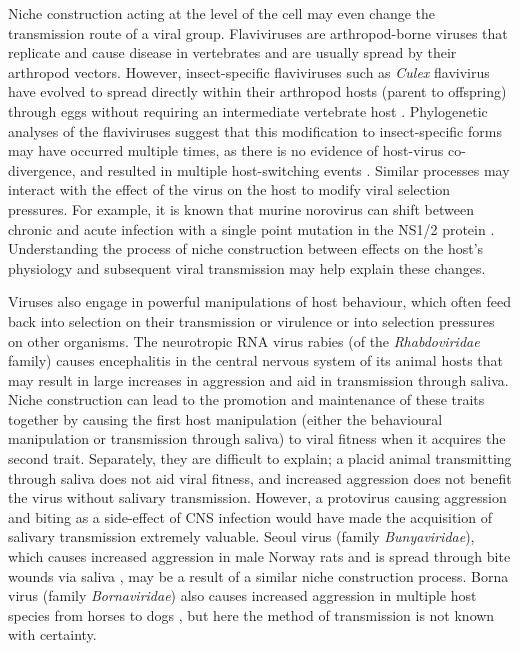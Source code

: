 \documentclass[review,draft,12pt]{elsarticle}
\begin{document}
Niche construction acting at the level of the cell may even change the
transmission route of a viral group. Flaviviruses are arthropod-borne
viruses that replicate and cause disease in vertebrates and are usually
spread by their arthropod vectors. However, insect-specific flaviviruses
such as \emph{Culex} flavivirus have evolved to spread directly within
their arthropod hosts (parent to offspring) through eggs without
requiring an intermediate vertebrate host \citep{Bolling:2012fp}.
Phylogenetic analyses of the flaviviruses suggest that this modification
to insect-specific forms may have occurred multiple times, as there is
no evidence of host-virus co-divergence, and resulted in multiple
host-switching events \citep{Cook:2012gt}. Similar processes may
interact with the effect of the virus on the host to modify viral
selection pressures. For example, it is known that murine norovirus can
shift between chronic and acute infection with a single point mutation
in the NS1/2 protein \citep{Borin2013}. Understanding the process of
niche construction between effects on the host's physiology and
subsequent viral transmission may help explain these changes.

Viruses also engage in powerful manipulations of host behaviour, which
often feed back into selection on their transmission or virulence or
into selection pressures on other organisms. The neurotropic RNA virus
rabies (of the \emph{Rhabdoviridae} family) causes encephalitis in the
central nervous system of its animal hosts \citep{Schnell:2010ve} that
may result in large increases in aggression and aid in transmission
through saliva. Niche construction can lead to the promotion and
maintenance of these traits together by causing the first host
manipulation (either the behavioural manipulation or transmission
through saliva) to viral fitness when it acquires the second trait.
Separately, they are difficult to explain; a placid animal transmitting
through saliva does not aid viral fitness, and increased aggression does
not benefit the virus without salivary transmission. However, a
protovirus causing aggression and biting as a side-effect of CNS
infection would have made the acquisition of salivary transmission
extremely valuable. Seoul virus (family \emph{Bunyaviridae}), which
causes increased aggression in male Norway rats \citep{Klein:2004tg} and
is spread through bite wounds via saliva \citep{Hinson:2004uq}, may be a
result of a similar niche construction process. Borna virus (family
\emph{Bornaviridae}) also causes increased aggression in multiple host
species from horses to dogs \citep{Kinnunen:2013cy}, but here the method
of transmission is not known with certainty.
\end{document}
